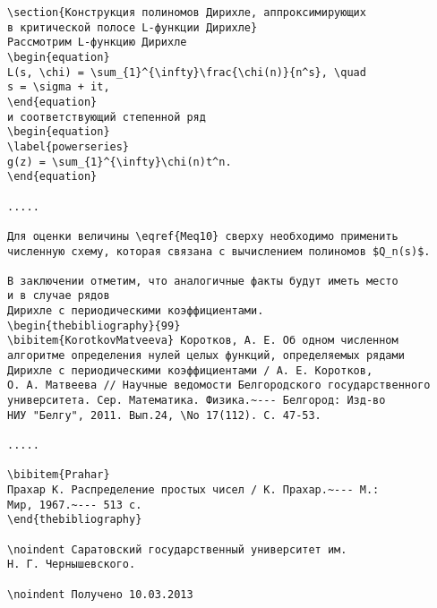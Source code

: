 \newpage
\begin{verbatim}
\section{Конструкция полиномов Дирихле, аппроксимирующих
в критической полосе L-функции Дирихле}
Рассмотрим L-функцию Дирихле
\begin{equation}
L(s, \chi) = \sum_{1}^{\infty}\frac{\chi(n)}{n^s}, \quad
s = \sigma + it,
\end{equation}
и соответствующий степенной ряд
\begin{equation}
\label{powerseries}
g(z) = \sum_{1}^{\infty}\chi(n)t^n.
\end{equation}

.....

Для оценки величины \eqref{Meq10} сверху необходимо применить
численную схему, которая связана с вычислением полиномов $Q_n(s)$.

В заключении отметим, что аналогичные факты будут иметь место
и в случае рядов
Дирихле с периодическими коэффициентами.
\begin{thebibliography}{99}
\bibitem{KorotkovMatveeva} Коротков, А. Е. Об одном численном
алгоритме определения нулей целых функций, определяемых рядами
Дирихле с периодическими коэффициентами / А. Е. Коротков,
О. А. Матвеева // Научные ведомости Белгородского государственного
университета. Сер. Математика. Физика.~--- Белгород: Изд-во
НИУ "Белгу", 2011. Вып.24, \No 17(112). С. 47-53.

.....

\bibitem{Prahar}
Прахар К. Распределение простых чисел / К. Прахар.~--- М.:
Мир, 1967.~--- 513 с.
\end{thebibliography}

\noindent Саратовский государственный университет им.
Н. Г. Чернышевского.

\noindent Получено 10.03.2013
\end{verbatim}
